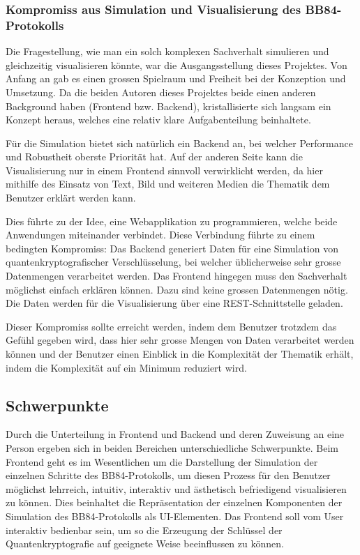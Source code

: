 \documentclass[a4paper,10.2pt,pdftex]{scrartcl}%
\begin{document}
\subsubsection{Kompromiss aus Simulation und Visualisierung des BB84-Protokolls}
Die Fragestellung, wie man ein solch komplexen Sachverhalt simulieren und gleichzeitig visualisieren könnte, war die Ausgangsstellung dieses Projektes. Von Anfang an gab es einen grossen Spielraum und Freiheit bei der Konzeption und Umsetzung. Da die beiden Autoren dieses Projektes beide einen anderen Background haben (Frontend bzw. Backend), kristallisierte sich langsam ein Konzept heraus, welches eine relativ klare Aufgabenteilung beinhaltete.

Für die Simulation bietet sich natürlich ein Backend an, bei welcher Performance und Robustheit oberste Priorität hat. Auf der anderen Seite kann die Visualisierung nur in einem Frontend sinnvoll verwirklicht werden, da hier mithilfe des Einsatz von Text, Bild und weiteren Medien die Thematik dem Benutzer erklärt werden kann.

Dies führte zu der Idee, eine Webapplikation zu programmieren, welche beide Anwendungen miteinander verbindet. Diese Verbindung führte zu einem bedingten Kompromiss: Das Backend generiert Daten für eine Simulation von quantenkryptografischer Verschlüsselung, bei welcher üblicherweise sehr grosse Datenmengen verarbeitet werden. Das Frontend hingegen muss den Sachverhalt möglichst einfach erklären können. Dazu sind keine grossen Datenmengen nötig. Die Daten werden für die Visualisierung über eine REST-Schnittstelle geladen. 

Dieser Kompromiss sollte erreicht werden, indem dem Benutzer trotzdem das Gefühl gegeben wird, dass hier sehr grosse Mengen von Daten verarbeitet werden können und der Benutzer einen Einblick in die Komplexität der Thematik erhält, indem die Komplexität auf ein Minimum reduziert wird.
 



\subsection{Schwerpunkte}
Durch die Unterteilung in Frontend und Backend und deren Zuweisung an eine Person ergeben sich in beiden Bereichen unterschiedliche Schwerpunkte. Beim Frontend geht es im Wesentlichen um die Darstellung der Simulation der einzelnen Schritte des BB84-Protokolls, um diesen Prozess für den Benutzer möglichst lehrreich, intuitiv, interaktiv und ästhetisch befriedigend visualisieren zu können. Dies beinhaltet die Repräsentation der einzelnen Komponenten der Simulation des BB84-Protokolls als UI-Elementen. Das Frontend soll vom User interaktiv bedienbar sein, um so die Erzeugung der Schlüssel der Quantenkryptografie auf geeignete Weise beeinflussen zu können.
\end{document}
